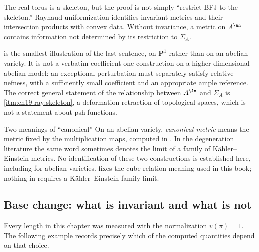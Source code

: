 \begin{remark}
\label{rem:ch31-abelian-not-restriction}
The real torus is a skeleton, but the proof is not simply ``restrict BFJ to
the skeleton.''  Raynaud uniformization identifies invariant metrics and
their intersection products with convex data.  Without invariance, a metric
on $A^{\An}$ contains information not determined by its restriction to
$\Sigma_A$.

 is the smallest illustration of the last
sentence, on $\mathbf P^1$ rather than on an abelian variety.  It is
not a verbatim coefficient-one construction on a higher-dimensional
abelian model: an exceptional perturbation must separately satisfy
relative nefness, with a sufficiently small coefficient and an appropriate
ample reference.  The correct general statement of the
relationship between $A^{\An}$ and $\Sigma_A$ is
\,\cref{itm:ch19-ray:skeleton}, a deformation
retraction of topological spaces, which is not a statement about psh
functions.
\end{remark}

\begin{warning}{Two meanings of ``canonical''}
On an abelian variety, \emph{canonical metric} means the metric fixed by the
multiplication maps, computed in .  In the
degeneration literature the same word sometimes denotes the limit of a
family of Kähler--Einstein metrics.  No identification of these two constructions is established here,
including for abelian varieties.  
fixes the cube-relation meaning used in this book; nothing in
 requires a K\"ahler--Einstein family limit.
\end{warning}

\subsection{Base change: what is invariant and what is not}
\label{sec:ch31-base-change}

Every length in this chapter was measured with the normalization
$v(\pi)=1$.  The following example records precisely which of the computed
quantities depend on that choice.

